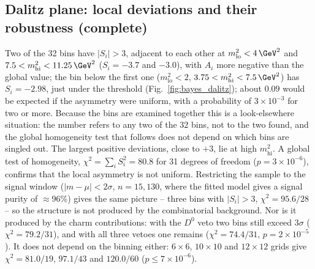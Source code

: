 \subsection{Dalitz plane: local deviations and their robustness (complete)}
Two of the 32 bins have $|S_i|>3$, adjacent to each other at $m^2_{\mathrm{lo}}<4\,\GeV^2$ and $7.5<m^2_{\mathrm{hi}}<11.25\,\GeV^2$ ($S_i=-3.7$ and $-3.0$), with $A_i$ more negative than the global value; the bin below the first one ($m^2_{\mathrm{lo}}<2$, $3.75<m^2_{\mathrm{hi}}<7.5\,\GeV^2$) has $S_i=-2.98$, just under the threshold (Fig.~\ref{fig:bayes_dalitz}); about $0.09$ would be expected if the asymmetry were uniform, with a probability of $3\times10^{-3}$ for two or more. Because the bins are examined together this is a look-elsewhere situation: the number refers to any two of the $32$ bins, not to the two found, and the global homogeneity test that follows does not depend on which bins are singled out. The largest positive deviations, close to $+3$, lie at high $m^2_{\mathrm{hi}}$. A global test of homogeneity, $\chi^2=\sum_i S_i^2=80.8$ for 31 degrees of freedom ($p=3\times10^{-6}$), confirms that the local asymmetry is not uniform. Restricting the sample to the signal window ($|m-\mu|<2\sigma$, $n=15{,}130$, where the fitted model gives a signal purity of $\approx$96\%) gives the same picture -- three bins with $|S_i|>3$, $\chi^2=95.6/28$ -- so the structure is not produced by the combinatorial background. Nor is it produced by the charm contributions: with the $D^0$ veto two bins still exceed $3\sigma$ ($\chi^2=79.2/31$), and with all three vetoes one remains ($\chi^2=74.4/31$, $p=2\times10^{-5}$). It does not depend on the binning either: $6\times6$, $10\times10$ and $12\times12$ grids give $\chi^2=81.0/19$, $97.1/43$ and $120.0/60$ ($p\leq7\times10^{-6}$).


